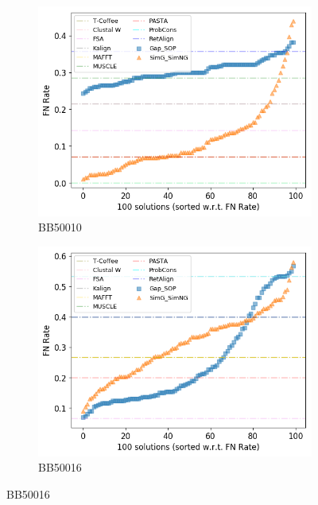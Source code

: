 \begin{figure}[!htbp]
\begin{adjustwidth}{-1cm}{-1cm}
		\begin{subfigure}{0.22\textwidth}
			\includegraphics[width=\columnwidth]{Figure/summary/precomputedInit/Balibase/BB50010_fnrate_density_single_run}
			\caption{BB50010}
		\end{subfigure}
		\begin{subfigure}{0.22\textwidth}
			\includegraphics[width=\columnwidth]{Figure/summary/precomputedInit/Balibase/BB50016_fnrate_density_single_run}
			\caption{BB50016}
		\end{subfigure}
		

\end{adjustwidth}
\end{figure}
